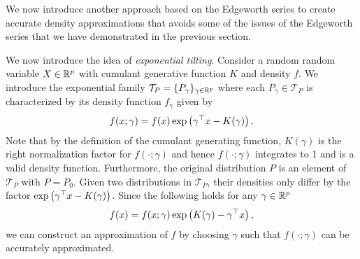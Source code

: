 We now introduce another approach based on the Edgeworth series to create accurate density approximations that avoids some of the issues of the Edgeworth series that we have demonstrated in the previous section.

We now introduce the idea of \textit{exponential tilting}. Consider a random random variable $X \in {\mathbb{R}^p}$ with cumulant generative function $K$ and density $f$. We introduce the exponential family $\mathcal{T}_P = \{ P_\gamma \}_{\gamma \in {\mathbb{R}^p}}$ where each $P_\gamma \in \mathcal{T}_P$ is characterized by its density function $f_\gamma$ given by
\begin{equation*}
    f(x; \gamma) = f(x)\exp\left(\gamma^\top x - K(\gamma)\right).
\end{equation*}
Note that by the definition of the cumulant generating function, $K(\gamma)$ is the right normalization factor for $f(\cdot; \gamma)$ and hence $f(\cdot; \gamma)$ integrates to 1 and is a valid density function. Furthermore, the original distribution $P$ is an element of $\mathcal{T}_P$ with $P = P_0$. Given two distributions in $\mathcal{T}_P$, their densities only differ by the factor $\exp\left(\gamma^\top x - K(\gamma)\right)$. Since the following holds for any $\gamma \in {\mathbb{R}^p}$
\begin{equation} \label{eq-saddlepoint-original}
    f(x) = f(x; \gamma)\exp\left(K(\gamma) - \gamma^\top x\right),
\end{equation}
we can construct an approximation of $f$ by choosing $\gamma$ such that $f(\cdot; \gamma)$ can be accurately approximated.

